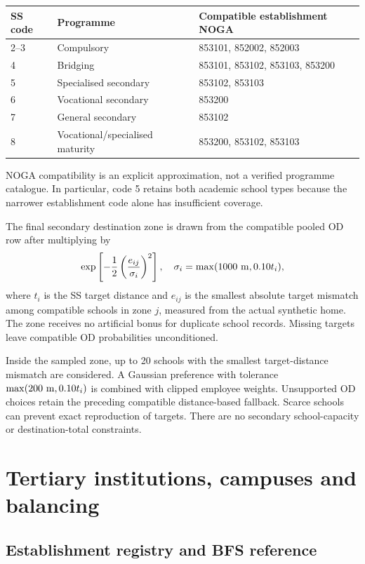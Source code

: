 \documentclass[11pt,a4paper]{article}
\begin{document}
\begin{center}\small
\begin{tabular}{lll}
\toprule SS code & Programme & Compatible establishment NOGA \\
\midrule
2--3 & Compulsory & 853101, 852002, 852003 \\
4 & Bridging & 853101, 853102, 853103, 853200 \\
5 & Specialised secondary & 853102, 853103 \\
6 & Vocational secondary & 853200 \\
7 & General secondary & 853102 \\
8 & Vocational/specialised maturity & 853200, 853102, 853103 \\
\bottomrule
\end{tabular}\end{center}

NOGA compatibility is an explicit approximation, not a verified programme
catalogue. In particular, code 5 retains both academic school types because
the narrower establishment code alone has insufficient coverage.

The final secondary destination zone is drawn from the compatible pooled OD
row after multiplying by
\[
 \exp\left[-\frac12\left(\frac{e_{ij}}{\sigma_i}\right)^2\right],
 \quad \sigma_i=\max(1000\ {\rm m},0.10t_i),
\]
where \(t_i\) is the SS target distance and \(e_{ij}\) is the smallest absolute
target mismatch among compatible schools in zone \(j\), measured from the
actual synthetic home. The zone receives no artificial bonus for duplicate
school records. Missing targets leave compatible OD probabilities unconditioned.

Inside the sampled zone, up to 20 schools with the smallest target-distance
mismatch are considered. A Gaussian preference with tolerance
\(\max(200\ {\rm m},0.10t_i)\) is combined with clipped employee weights.
Unsupported OD choices retain the preceding compatible distance-based
fallback. Scarce schools can prevent exact reproduction of targets. There
are no secondary school-capacity or destination-total constraints.

\section{Tertiary institutions, campuses and balancing}
\subsection{Establishment registry and BFS reference}
\end{document}
